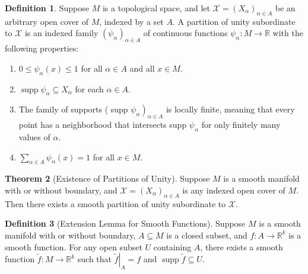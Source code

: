 \documentclass[12pt,a4paper]{book}
\newenvironment{enu}{\begin{enumerate}[(1)]}{\end{enumerate}}
\theoremstyle{definition}
\newtheorem{defn}{Definition}[section]
\newtheorem{theo}[defn]{Theorem}
\begin{document}
\begin{defn}
    Suppose $M$ is a topological space, and let $\mathcal{X}=\left(X_\alpha\right)_{\alpha \in A}$ be an arbitrary open cover of $M$, indexed by a set $A$. A partition of unity subordinate to $\mathcal{X}$ is an indexed family $\left(\psi_\alpha\right)_{\alpha \in A}$ of continuous functions $\psi_\alpha: M \rightarrow \mathbb{R}$ with the following properties:
    \begin{enu}
        \item $0 \leq \psi_\alpha(x) \leq 1$ for all $\alpha \in A$ and all $x \in M$.
        \item  $\operatorname{supp} \psi_\alpha \subseteq X_\alpha$ for each $\alpha \in A$.
        \item  The family of supports ( supp $\left.\psi_\alpha\right)_{\alpha \in A}$ is locally finite, meaning that every point has a neighborhood that intersects supp $\psi_\alpha$ for only finitely many values of $\alpha$.
        \item  $\sum_{\alpha \in A} \psi_\alpha(x)=1$ for all $x \in M$.
    \end{enu}
\end{defn}
\begin{theo}[Existence of Partitions of Unity]
    Suppose $M$ is a smooth manifold with or without boundary, and $\mathcal{X}=\left(X_\alpha\right)_{\alpha \in A}$ is any indexed open cover of $M$. Then there exists a smooth partition of unity subordinate to $\mathcal{X}$.
\end{theo}
\begin{defn}[Extension Lemma for Smooth Functions]
    Suppose $M$ is a smooth manifold with or without boundary, $A \subseteq M$ is a closed subset, and $f: A \rightarrow \mathbb{R}^k$ is a smooth function. For any open subset $U$ containing $A$, there exists a smooth function $\widetilde{f}: M \rightarrow \mathbb{R}^k$ such that $\left.\widetilde{f}\right|_A=f$ and $\operatorname{supp} \tilde{f} \subseteq U$.
\end{defn}
\end{document}
